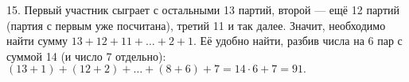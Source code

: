 15. Первый участник сыграет с остальными 13 партий, второй --- ещё 12 партий (партия с первым уже посчитана), третий 11 и так далее. Значит, необходимо найти сумму $13+12+11+\ldots+2+1.$ Её удобно найти, разбив числа на 6 пар с суммой 14 (и число 7 отдельно): $(13+1)+(12+2)+\ldots+(8+6)+7=14\cdot6+7=91.$\\
